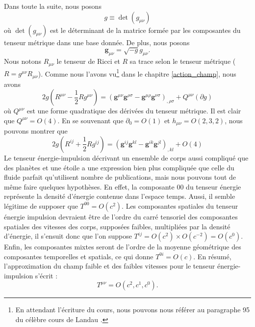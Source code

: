 			Dans toute la suite, nous posons
			\begin{equation}
				g\equiv \det(g_{\mu\nu})
			\end{equation}
			où $\det(g_{\mu\nu})$ est le déterminant de la matrice formée par les composantes du tenseur métrique dans une base donnée. De plus, nous posons
			\begin{equation}
				\textbf{g}_{\mu\nu}=\sqrt{-g} g_{\mu\nu}.
			\end{equation}
			Nous notons $R_{\mu\nu}$ le tenseur de Ricci et $R$ sa trace selon le tenseur métrique ($R=g^{\mu\nu}R_{\mu\nu}$).
			Comme nous l'avons vu\footnote{En attendant l'écriture du cours, nous pouvons nous référer au paragraphe 95 du célèbre cours de Landau \cite{landau}.} dans le chapitre \ref{action_champ}, nous avons
			\begin{equation}
			 	2g\left(R^{\mu\nu} - \frac{1}{2} R g^{\mu\nu}\right) = \left( \textbf{g}^{\mu\nu}\textbf{g}^{\rho\sigma}-\textbf{g}^{\mu\rho}\textbf{g}^{\nu\sigma} \right)_{,\rho\sigma}+Q^{\mu\nu}(\partial g)
			\end{equation} 
			où $Q^{\mu\nu}$ est une forme quadratique des dérivées du tenseur métrique. Il est clair que $Q^{\mu\nu}=O(4)$. En se souvenant que $\partial_0=O(1)$ et $h_{\mu\nu}=O(2,3,2)$, nous pouvons montrer que
			\begin{equation}\label{ricci_espace}
				2g(R^{ij}+\frac{1}{2}Rg^{ij})= (\textbf{g}^{ij}\textbf{g}^{kl} - \textbf{g}^{ik}\textbf{g}^{jl})_{,kl}+O(4)
			\end{equation}
			Le tenseur énergie-impulsion décrivant un ensemble de corps aussi compliqué que des planètes et une étoile a une expression bien plus compliquée que celle du fluide parfait qu'utilisent nombre de publications, mais nous pouvons tout de même faire quelques hypothèses. En effet, la composante $00$ du tenseur énergie représente la densité d'énergie contenue dans l'espace temps. Aussi, il semble légitime de supposer que $T^{00}=O(c^2)$. Les composantes spatiales du tenseur énergie impulsion devraient être de l'ordre du carré tensoriel des composantes spatiales des vitesses des corps, supposées faibles, multipliées par la densité d'énergie, il s'ensuit donc que l'on suppose $T^{ij}=O(c^2)\times O(c^{-2})=O(c^0)$. Enfin, les composantes mixtes seront de l'ordre de la moyenne géométrique des composantes temporelles et spatials, ce qui donne $T^{0i}=O(c)$. En résumé, l'approximation du champ faible et des faibles vitesses pour le tenseur énergie-impulsion s'écrit : 
			\begin{equation}
				T^{\mu\nu}=O(c^2,c^1,c^0).
			\end{equation}
